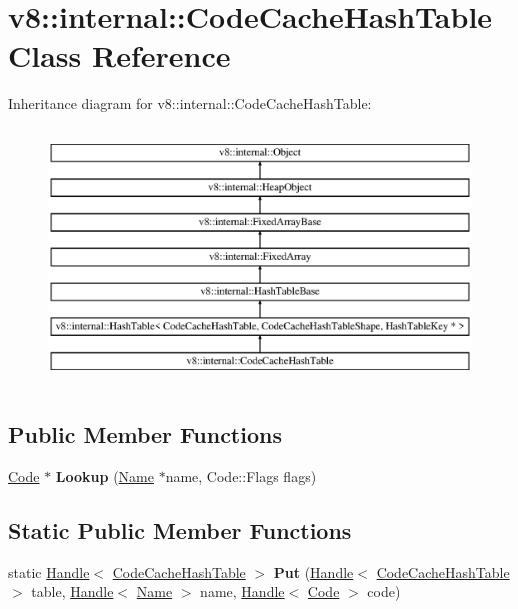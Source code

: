 \hypertarget{classv8_1_1internal_1_1_code_cache_hash_table}{}\section{v8\+:\+:internal\+:\+:Code\+Cache\+Hash\+Table Class Reference}
\label{classv8_1_1internal_1_1_code_cache_hash_table}
Inheritance diagram for v8\+:\+:internal\+:\+:Code\+Cache\+Hash\+Table\+:\begin{figure}[H]
\begin{center}
\leavevmode
\includegraphics[height=6.829268cm]{classv8_1_1internal_1_1_code_cache_hash_table}
\end{center}
\end{figure}
\subsection*{Public Member Functions}
\begin{DoxyCompactItemize}
\item 
\hyperlink{classv8_1_1internal_1_1_code}{Code} $\ast$ {\bfseries Lookup} (\hyperlink{classv8_1_1internal_1_1_name}{Name} $\ast$name, Code\+::\+Flags flags)\hypertarget{classv8_1_1internal_1_1_code_cache_hash_table_ab9b95bf12a99746d6619a15571f5f9e1}{}\label{classv8_1_1internal_1_1_code_cache_hash_table_ab9b95bf12a99746d6619a15571f5f9e1}

\end{DoxyCompactItemize}
\subsection*{Static Public Member Functions}
\begin{DoxyCompactItemize}
\item 
static \hyperlink{classv8_1_1internal_1_1_handle}{Handle}$<$ \hyperlink{classv8_1_1internal_1_1_code_cache_hash_table}{Code\+Cache\+Hash\+Table} $>$ {\bfseries Put} (\hyperlink{classv8_1_1internal_1_1_handle}{Handle}$<$ \hyperlink{classv8_1_1internal_1_1_code_cache_hash_table}{Code\+Cache\+Hash\+Table} $>$ table, \hyperlink{classv8_1_1internal_1_1_handle}{Handle}$<$ \hyperlink{classv8_1_1internal_1_1_name}{Name} $>$ name, \hyperlink{classv8_1_1internal_1_1_handle}{Handle}$<$ \hyperlink{classv8_1_1internal_1_1_code}{Code} $>$ code)\hypertarget{classv8_1_1internal_1_1_code_cache_hash_table_a7e3d0aee89a7456b78ce953c1209cc70}{}\label{classv8_1_1internal_1_1_code_cache_hash_table_a7e3d0aee89a7456b78ce953c1209cc70}

\end{DoxyCompactItemize}
